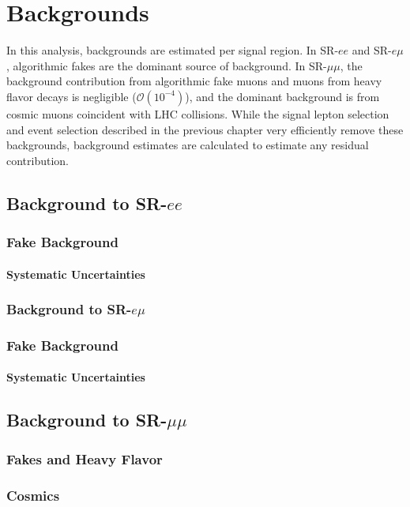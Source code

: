 \chapter{Backgrounds}

In this analysis, backgrounds are estimated per signal region. In SR-$ee$ and SR-$e\mu$, algorithmic fakes are the dominant source of background. In SR-$\mu\mu$, the background contribution from algorithmic fake muons and muons from heavy flavor decays is negligible ($\mathcal{O}(10^{-4})$), and the dominant background is from cosmic muons coincident with \ac{LHC} collisions. While the signal lepton selection and event selection described in the previous chapter very efficiently remove these backgrounds, background estimates are calculated to estimate any residual contribution. 


\section{Background to SR-$ee$}
\subsection{Fake Background}
\subsubsection{Systematic Uncertainties}

\subsection{Background to SR-$e\mu$}
\subsection{Fake Background}
\subsubsection{Systematic Uncertainties}

\section{Background to SR-$\mu\mu$}
\subsection{Fakes and Heavy Flavor}
\subsection{Cosmics}
\label{sec:cosmics}
